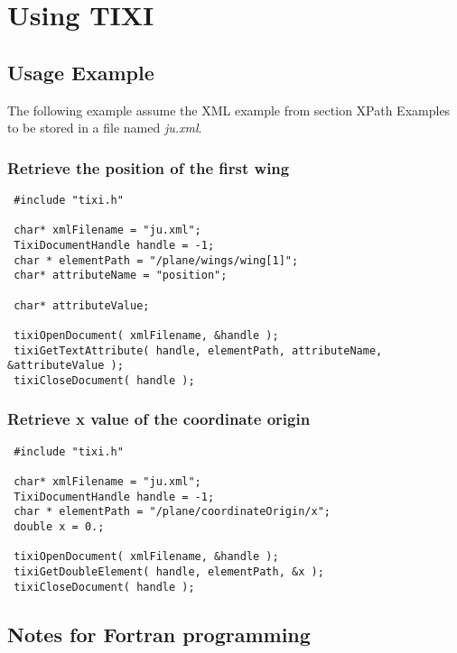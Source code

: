 
\chapter{Using TIXI}\label{usingTixi}

\section{Usage Example}\label{Usage Example}

The following example assume the XML example from section XPath Examples to be stored in a file named \textit{ju.xml}.

\subsection{Retrieve the position of the first wing}

\begin{verbatim}
 #include "tixi.h"

 char* xmlFilename = "ju.xml";
 TixiDocumentHandle handle = -1;
 char * elementPath = "/plane/wings/wing[1]";
 char* attributeName = "position";

 char* attributeValue;

 tixiOpenDocument( xmlFilename, &handle );
 tixiGetTextAttribute( handle, elementPath, attributeName, &attributeValue );
 tixiCloseDocument( handle );
\end{verbatim}




\subsection{Retrieve x value of the coordinate origin}

\begin{verbatim}
 #include "tixi.h"

 char* xmlFilename = "ju.xml";
 TixiDocumentHandle handle = -1;
 char * elementPath = "/plane/coordinateOrigin/x";
 double x = 0.;

 tixiOpenDocument( xmlFilename, &handle );
 tixiGetDoubleElement( handle, elementPath, &x );
 tixiCloseDocument( handle );
\end{verbatim}



\section{Notes for Fortran programming}

